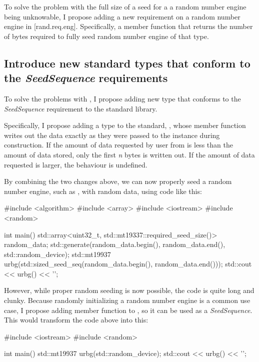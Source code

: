\documentclass{wg21}
\begin{document}
To solve the problem with the full size of a seed for a a random number
engine being unknowable, I propose adding a new requirement on a random
number engine in [rand.req.eng]. Specifically, a member function
 that returns the
number of bytes required to fully seed random number engine of that
type.


\hypertarget{solution-2-add-std-sequences}{%
    \subsection{Introduce new standard types that conform to the \emph{SeedSequence} requirements}
    \label{solution-2-add-std-sequences}}

To solve the problems with , I propose adding new
type that conforms to the \emph{SeedSequence} requirement to the
standard library.

Specifically, I propose adding a type to the standard,
, whose  member function writes
out the data exactly as they were passed to the instance during
construction. If the amount of data requested by user from
 is less than the amount of data stored, only the first
\emph{n} bytes is written out. If the amount of data requested is larger,
the behaviour is undefined.

By combining the two changes above, we can now properly seed a random
number engine, such as , with random data, using code
like this:

\begin{codeblock}
#include <algorithm>
#include <array>
#include <iostream>
#include <random>

int main() {
    std::array<uint32_t, std::mt19337::required_seed_size()> random_data;
    std::generate(random_data.begin(), random_data.end(), std::random_device{});
    std::mt19937 urbg(std::sized_seed_seq(random_data.begin(), random_data.end()));
    std::cout << urbg() << '\n';
}
\end{codeblock}

However, while proper random seeding is now possible, the code is quite
long and clunky. Because randomly initializing a random number engine
is a common use case, I propose adding  member function
to , so it can be used as a \emph{SeedSequence}.
This would transform the code above into this:

\begin{codeblock}
#include <iostream>
#include <random>

int main() {
    std::mt19937 urbg(std::random_device{});
    std::cout << urbg() << '\n';
}
\end{codeblock}
\end{document}
